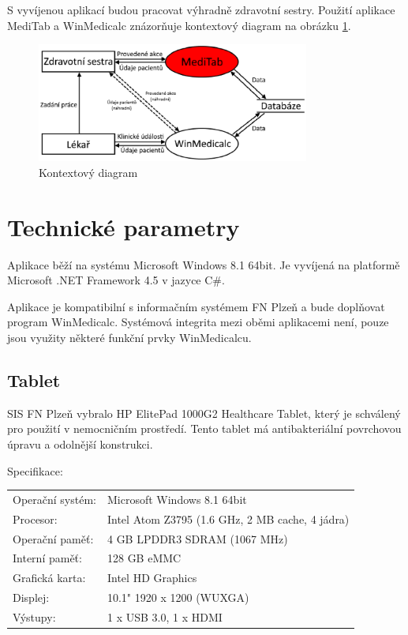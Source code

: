 S vyvíjenou aplikací budou pracovat výhradně zdravotní sestry. Použití aplikace MediTab a WinMedicalc znázorňuje kontextový diagram na obrázku \ref{fig:kontext}.

\begin{figure}[H]
	\centering
	\includegraphics[width=0.8\textwidth]{img/kontext.eps}
	\caption{Kontextový diagram}
  \label{fig:kontext}
\end{figure}


\section{Technické parametry}

Aplikace běží na systému Microsoft Windows 8.1 64bit. Je vyvíjená na platformě Microsoft .NET Framework 4.5 v jazyce C\#.

Aplikace je kompatibilní s informačním systémem FN Plzeň a bude doplňovat program WinMedicalc. Systémová integrita mezi oběmi aplikacemi není, pouze jsou využity některé funkční prvky WinMedicalcu.

\subsection{Tablet}

SIS FN Plzeň vybralo HP ElitePad 1000G2 Healthcare Tablet, který je schválený pro použití v nemocničním prostředí. Tento tablet má antibakteriální povrchovou úpravu a odolnější konstrukci.

\noindent
Specifikace:

\noindent
\begin{tabular}{l l}
	Operační systém: & Microsoft Windows 8.1 64bit\\
	Procesor: & Intel Atom Z3795 (1.6 GHz, 2 MB cache, 4 jádra)\\
	Operační paměť: & 4 GB LPDDR3 SDRAM (1067 MHz)\\
	Interní paměť: & 128 GB eMMC\\
	Grafická karta: & Intel HD Graphics\\
	Displej: & 10.1" 1920 x 1200 (WUXGA)\\
	Výstupy: & 1 x USB 3.0, 1 x HDMI
\end{tabular}


